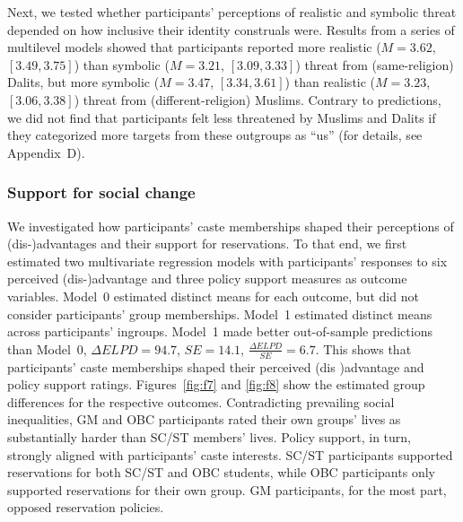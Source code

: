 \documentclass[12pt, a4paper]{article}
\begin{document}
Next, we tested whether participants' perceptions of realistic and symbolic threat depended on how inclusive their identity construals were. Results from a series of multilevel models showed that participants reported more realistic ($M = 3.62$, $[3.49, 3.75]$) than symbolic ($M = 3.21$, $[3.09, 3.33]$) threat from (same-religion) Dalits, but more symbolic ($M = 3.47$, $[3.34, 3.61]$) than realistic ($M = 3.23$, $[3.06, 3.38]$) threat from (different-religion) Muslims. Contrary to predictions, we did not find that participants felt less threatened by Muslims and Dalits if they categorized more targets from these outgroups as ``us'' (for details, see Appendix~D).

\subsubsection{Support for social change}

We investigated how participants' caste memberships shaped their perceptions of (dis-)advantages and their support for reservations. To that end, we first estimated two multivariate regression models with participants' responses to six perceived (dis-)advantage and three policy support measures as outcome variables. Model~0 estimated distinct means for each outcome, but did not consider participants' group memberships. Model~1 estimated distinct means across participants' ingroups. Model~1 made better out-of-sample predictions than Model~0, $\Delta\textit{ELPD} = 94.7$, $\textit{SE} = 14.1$, $\frac{\Delta\textit{ELPD}}{\textit{SE}} = 6.7$. This shows that participants' caste memberships shaped their perceived (dis )advantage and policy support ratings. Figures~\ref{fig:f7} and \ref{fig:f8} show the estimated group differences for the respective outcomes. Contradicting prevailing social inequalities, GM and OBC participants rated their own groups' lives as substantially harder than SC/ST members' lives. Policy support, in turn, strongly aligned with participants' caste interests. SC/ST participants supported reservations for both SC/ST and OBC students, while OBC participants only supported reservations for their own group. GM participants, for the most part, opposed reservation policies.
\end{document}
